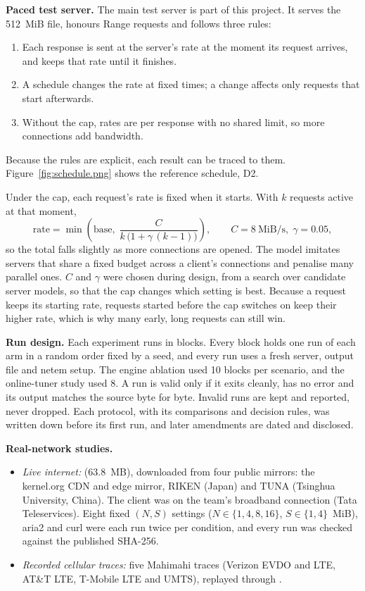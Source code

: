 \textbf{Paced test server.} The main test server is part of this project. It serves the 512~MiB file, honours Range requests and follows three rules:
\begin{enumerate}
\item Each response is sent at the server's rate at the moment its request arrives, and keeps that rate until it finishes.
\item A schedule changes the rate at fixed times; a change affects only requests that start afterwards.
\item Without the cap, rates are per response with no shared limit, so more connections add bandwidth.
\end{enumerate}
Because the rules are explicit, each result can be traced to them. Figure~\ref{fig:schedule.png} shows the reference schedule, D2.

Under the cap, each request's rate is fixed when it starts. With $k$ requests active at that moment,
\begin{equation}
\label{eq:cap}\text{rate} = \min\!\left(\text{base},\; \frac{C}{k\,\bigl(1 + \gamma\,(k-1)\bigr)}\right), \qquad C = 8~\text{MiB/s},\; \gamma = 0.05,
\end{equation}
so the total falls slightly as more connections are opened. The model imitates servers that share a fixed budget across a client's connections and penalise many parallel ones. $C$ and $\gamma$ were chosen during design, from a search over candidate server models, so that the cap changes which setting is best. Because a request keeps its starting rate, requests started before the cap switches on keep their higher rate, which is why many early, long requests can still win.

\textbf{Run design.} Each experiment runs in blocks. Every block holds one run of each arm in a random order fixed by a seed, and every run uses a fresh server, output file and netem setup. The engine ablation used 10 blocks per scenario, and the online-tuner study used 8. A run is valid only if it exits cleanly, has no error and its output matches the source byte for byte. Invalid runs are kept and reported, never dropped. Each protocol, with its comparisons and decision rules, was written down before its first run, and later amendments are dated and disclosed.

\textbf{Real-network studies.}
\begin{itemize}
\item \emph{Live internet:}  (63.8~MB), downloaded from four public mirrors: the kernel.org CDN and edge mirror, RIKEN (Japan) and TUNA (Tsinghua University, China). The client was on the team's broadband connection (Tata Teleservices). Eight fixed $(N, S)$ settings ($N \in \{1, 4, 8, 16\}$, $S \in \{1, 4\}$~MiB), aria2 and curl were each run twice per condition, and every run was checked against the published SHA-256.
\item \emph{Recorded cellular traces:} five Mahimahi traces (Verizon EVDO and LTE, AT\&T LTE, T-Mobile LTE and UMTS), replayed through .
\end{itemize}

